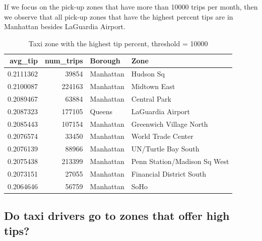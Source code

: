\documentclass[12pt,twoside]{reedthesis}
\newenvironment{Shaded}{\begin{snugshade}}{\end{snugshade}}
\newcommand{\KeywordTok}[1]{\textcolor[rgb]{0.13,0.29,0.53}{\textbf{#1}}}
\newcommand{\DataTypeTok}[1]{\textcolor[rgb]{0.13,0.29,0.53}{#1}}
\newcommand{\DecValTok}[1]{\textcolor[rgb]{0.00,0.00,0.81}{#1}}
\newcommand{\StringTok}[1]{\textcolor[rgb]{0.31,0.60,0.02}{#1}}
\newcommand{\CommentTok}[1]{\textcolor[rgb]{0.56,0.35,0.01}{\textit{#1}}}
\newcommand{\OperatorTok}[1]{\textcolor[rgb]{0.81,0.36,0.00}{\textbf{#1}}}
\newcommand{\NormalTok}[1]{#1}
\theoremstyle{definition}
\theoremstyle{definition}
\theoremstyle{definition}
\theoremstyle{remark}
\begin{document}
If we focus on the pick-up zones that have more than 10000 trips per
month, then we observe that all pick-up zones that have the highest
percent tips are in Manhattan besides LaGuardia Airport.
\begin{Shaded}
\end{Shaded}
\begin{table}

\caption{\label{tab:unnamed-chunk-19}Taxi zone with the highest tip percent, threshold = 10000}
\centering
\begin{tabular}[t]{r|r|l|l}
\hline
avg\_tip & num\_trips & Borough & Zone\\
\hline
0.2111362 & 39854 & Manhattan & Hudson Sq\\
\hline
0.2100087 & 224163 & Manhattan & Midtown East\\
\hline
0.2089467 & 63884 & Manhattan & Central Park\\
\hline
0.2087323 & 177105 & Queens & LaGuardia Airport\\
\hline
0.2085443 & 107154 & Manhattan & Greenwich Village North\\
\hline
0.2076574 & 33450 & Manhattan & World Trade Center\\
\hline
0.2076139 & 88966 & Manhattan & UN/Turtle Bay South\\
\hline
0.2075438 & 213399 & Manhattan & Penn Station/Madison Sq West\\
\hline
0.2073151 & 27055 & Manhattan & Financial District South\\
\hline
0.2064646 & 56759 & Manhattan & SoHo\\
\hline
\end{tabular}
\end{table}
\subsection{Do taxi drivers go to zones that offer high
tips?}\label{do-taxi-drivers-go-to-zones-that-offer-high-tips}
\end{document}
